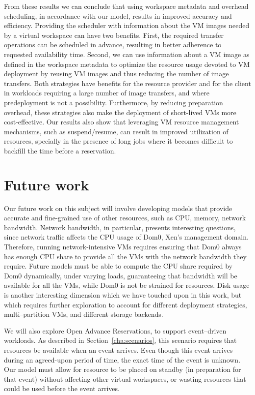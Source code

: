 \begin{itemize}
\end{itemize}

From these results we can conclude that using workspace metadata and overhead scheduling, in accordance with our model, results in improved accuracy and efficiency. Providing the scheduler with information about the VM images needed by a virtual workspace can have two benefits. First, the required transfer operations can be scheduled in advance, resulting in better adherence to requested availability time. Second, we can use information about a VM image as defined in the workspace metadata to optimize the resource usage devoted to VM deployment by reusing VM images and thus reducing the number of image transfers. Both strategies have benefits for the resource provider and for the client in workloads requiring a large number of image transfers, and where predeployment is not a possibility. Furthermore, by reducing preparation overhead, these strategies also make the deployment of short{}-lived VMs more cost{}-effective. Our results also show that leveraging VM resource management mechanisms, such as suspend/resume, can result in improved utilization of resources, specially in the presence of long jobs where it becomes difficult to backfill the time before a reservation.


\section{Future work}

Our future work on this subject will involve developing models that provide accurate and fine-grained use of other resources, such as CPU, memory, network bandwidth. Network bandwidth, in particular, presents interesting questions, since network traffic affects the CPU usage of Dom0, Xen's management domain. Therefore, running network-intensive VMs requires ensuring that Dom0 always has enough CPU share to provide all the VMs with the network bandwidth they require. Future models must be able to  compute the CPU share required by Dom0 dynamically, under varying loads, guaranteeing that bandwidth will be available for all the VMs, while Dom0 is not be strained for resources. Disk usage is another interesting dimension which we have touched upon in this work, but which requires further exploration to account for different deployment strategies, multi--partition VMs, and different storage backends.

We will also explore Open Advance Reservations, to support event--driven workloads. As described in Section~\ref{cha:scenarios}, this scenario requires that resources be available when an event arrives. Even though this event arrives during an agreed-upon period of time, the exact time of the event is unknown. Our model must allow for resource to be placed on standby (in preparation for that event) without affecting other virtual workspaces, or wasting resources that could be used before the event arrives.

